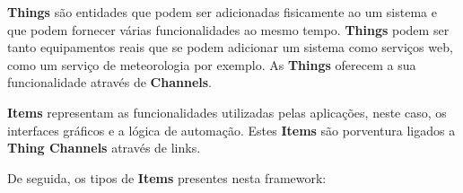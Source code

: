 \textbf{Things} são entidades que podem ser adicionadas fisicamente ao um sistema e que podem fornecer várias funcionalidades ao mesmo tempo. \textbf{Things} podem ser tanto equipamentos reais que se podem adicionar um sistema como serviços web, como um serviço de meteorologia por exemplo. As \textbf{Things} oferecem a sua funcionalidade através de \textbf{Channels}.

\textbf{Items} representam as funcionalidades utilizadas pelas aplicações, neste caso, os interfaces gráficos e a lógica de automação. Estes \textbf{Items} são porventura ligados a \textbf{Thing Channels}  através de links. 

De seguida, os tipos de \textbf{Items} presentes nesta framework:

\begin{table}[H]
\centering
{}
\end{table}
